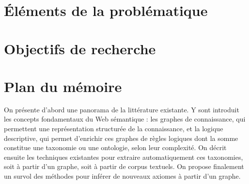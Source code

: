 \label{sec:Introduction}  %



\clearpage

\section{Éléments de la problématique}  %





\section{Objectifs de recherche}  %


\section{Plan du mémoire}  %


On présente d'abord une panorama de la littérature existante. Y sont introduit les concepts fondamentaux du Web sémantique : les graphes de connaissance, qui permettent une représentation structurée de la connaissance, et la logique descriptive, qui permet d'enrichir ces graphes de règles logiques dont la somme constitue une taxonomie ou une ontologie, selon leur complexité. On décrit ensuite les techniques existantes pour extraire automatiquement ces taxonomies, soit à partir d'un graphe, soit à partir de corpus textuels. On propose finalement un survol des méthodes pour inférer de nouveaux axiomes à partir d'un graphe.

